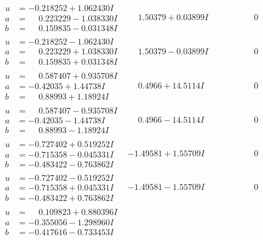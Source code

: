 \documentclass[1p]{elsarticle_modified}
\theoremstyle{definition}
\begin{document}
$$\begin{array}{c|c|c}
\begin{aligned}
u &= -0.218252 + 1.062430 I \\
a &= \phantom{-}0.223229 - 1.038330 I \\
b &= \phantom{-}0.159835 - 0.031348 I\end{aligned}
 & \phantom{-}1.50379 + 0.03899 I & \phantom{-0.000000 } 0 \\ \hline\begin{aligned}
u &= -0.218252 - 1.062430 I \\
a &= \phantom{-}0.223229 + 1.038330 I \\
b &= \phantom{-}0.159835 + 0.031348 I\end{aligned}
 & \phantom{-}1.50379 - 0.03899 I & \phantom{-0.000000 } 0 \\ \hline\begin{aligned}
u &= \phantom{-}0.587407 + 0.935708 I \\
a &= -0.42035 + 1.44738 I \\
b &= \phantom{-}0.88993 + 1.18924 I\end{aligned}
 & \phantom{-}0.4966 + 14.5114 I & \phantom{-0.000000 } 0 \\ \hline\begin{aligned}
u &= \phantom{-}0.587407 - 0.935708 I \\
a &= -0.42035 - 1.44738 I \\
b &= \phantom{-}0.88993 - 1.18924 I\end{aligned}
 & \phantom{-}0.4966 - 14.5114 I & \phantom{-0.000000 } 0 \\ \hline\begin{aligned}
u &= -0.727402 + 0.519252 I \\
a &= -0.715358 - 0.045331 I \\
b &= -0.483422 - 0.763862 I\end{aligned}
 & -1.49581 + 1.55709 I & \phantom{-0.000000 } 0 \\ \hline\begin{aligned}
u &= -0.727402 - 0.519252 I \\
a &= -0.715358 + 0.045331 I \\
b &= -0.483422 + 0.763862 I\end{aligned}
 & -1.49581 - 1.55709 I & \phantom{-0.000000 } 0 \\ \hline\begin{aligned}
u &= \phantom{-}0.109823 + 0.880396 I \\
a &= -0.355056 - 1.298960 I \\
b &= -0.417616 - 0.733453 I\end{aligned}

\end{array}$$
\end{document}
